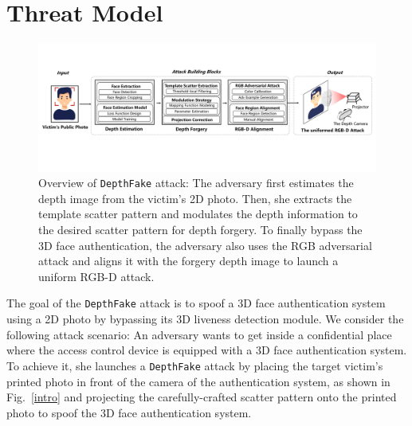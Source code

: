 \section{Threat Model}


\begin{figure}[pt]
	\centerline{\includegraphics[width = \textwidth]{figures/overview_1.pdf}}
	\vspace{-0.1in}
	\caption{Overview of \texttt{DepthFake} attack: The adversary first estimates the depth image from the victim's 2D photo. Then, she extracts the template scatter pattern and modulates the depth information to the desired scatter pattern for depth forgery. To finally bypass the 3D face authentication, the adversary also uses the RGB adversarial attack and aligns it with the forgery depth image to launch a uniform RGB-D attack.}
	\label{overview}
	\vspace{-0.15in}
\end{figure}

The goal of the \texttt{DepthFake} attack is to spoof a 3D face authentication system using a 2D photo by bypassing its 3D liveness detection module. We consider the following attack scenario: An adversary wants to get inside a confidential place where the access control device is equipped with  a 3D face authentication system. To achieve it, she launches a \texttt{DepthFake} attack by placing the target victim's printed photo in front of the camera of the authentication system, as shown in Fig.~\ref{intro} and projecting the carefully-crafted scatter pattern onto the printed photo to spoof the 3D face authentication system.
%
%


